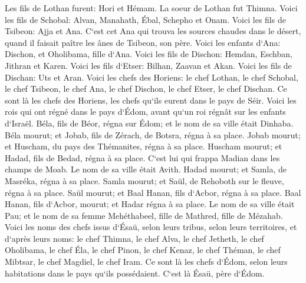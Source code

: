 \verse Les fils de Lothan furent: Hori et Hémam. La soeur de Lothan fut Thimna. 
\verse Voici les fils de Schobal: Alvan, Manahath, Ébal, Schepho et Onam. 
\verse Voici les fils de Tsibeon: Ajja et Ana. C`est cet Ana qui trouva les sources chaudes dans le désert, quand il faisait paître les ânes de Tsibeon, son père. 
\verse Voici les enfants d`Ana: Dischon, et Oholibama, fille d`Ana. 
\verse Voici les fils de Dischon: Hemdan, Eschban, Jithran et Karen. 
\verse Voici les fils d`Etser: Bilhan, Zaavan et Akan. 
\verse Voici les fils de Dischan: Uts et Aran. 
\verse Voici les chefs des Horiens: le chef Lothan, le chef Schobal, le chef Tsibeon, le chef Ana, 
\verse le chef Dischon, le chef Etser, le chef Dischan. Ce sont là les chefs des Horiens, les chefs qu`ils eurent dans le pays de Séir. 
\verse Voici les rois qui ont régné dans le pays d`Édom, avant qu`un roi régnât sur les enfants d`Israël. 
\verse Béla, fils de Béor, régna sur Édom; et le nom de sa ville était Dinhaba. 
\verse Béla mourut; et Jobab, fils de Zérach, de Botsra, régna à sa place. 
\verse Jobab mourut; et Huscham, du pays des Thémanites, régna à sa place. 
\verse Huscham mourut; et Hadad, fils de Bedad, régna à sa place. C`est lui qui frappa Madian dans les champs de Moab. Le nom de sa ville était Avith. 
\verse Hadad mourut; et Samla, de Masréka, régna à sa place. 
\verse Samla mourut; et Saül, de Rehoboth sur le fleuve, régna à sa place. 
\verse Saül mourut; et Baal Hanan, fils d`Acbor, régna à sa place. 
\verse Baal Hanan, fils d`Acbor, mourut; et Hadar régna à sa place. Le nom de sa ville était Pau; et le nom de sa femme Mehéthabeel, fille de Mathred, fille de Mézahab. 
\verse Voici les noms des chefs issus d`Ésaü, selon leurs tribus, selon leurs territoires, et d`après leurs noms: le chef Thimna, le chef Alva, le chef Jetheth, 
\verse le chef Oholibama, le chef Éla, le chef Pinon, 
\verse le chef Kenaz, le chef Théman, le chef Mibtsar, 
\verse le chef Magdiel, le chef Iram. Ce sont là les chefs d`Édom, selon leurs habitations dans le pays qu`ils possédaient. C`est là Ésaü, père d`Édom. 

